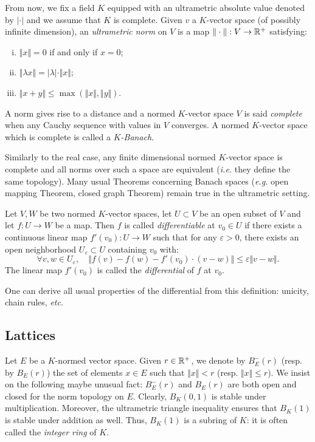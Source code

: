 \documentclass{amsart}
\begin{document}
From now, we fix a field $K$ equipped with an ultrametric absolute value 
denoted by $|\cdot|$ and we assume that $K$ is complete. Given $v$ a 
$K$-vector space (of possibly infinite dimension), an \emph{ultrametric 
norm} on $V$ is a map $\Vert\cdot\Vert : V \to \mathbb R^+$ satisfying:
\begin{enumerate}[(i)]
\item $\Vert x\Vert = 0$ if and only if $x = 0$;
\item $\Vert \lambda x\Vert = |\lambda| \cdot \Vert x\Vert$;
\item $\Vert x+y\Vert \leq \max(\Vert x\Vert, \Vert y\Vert)$.
\end{enumerate}
A norm gives rise to a distance and a normed $K$-vector space $V$ is 
said \emph{complete} when any Cauchy sequence with values in $V$ 
converges. A normed $K$-vector space which is complete is called a 
\emph{$K$-Banach}.

Similarly to the real case, any finite dimensional normed $K$-vector 
space is complete and all norms over such a space are equivalent 
(\emph{i.e.} they define the same topology). Many usual Theorems 
concerning Banach spaces (\emph{e.g.} open mapping Theorem, closed graph 
Theorem) remain true in the ultrametric setting.

\begin{deftn}
Let $V, W$ be two normed $K$-vector spaces, let $U \subset V$ be an open 
subset of $V$ and let $f : U \rightarrow W$ be a map. Then $f$ is called 
\emph{differentiable} at $v_0 \in U$ if there exists a 
continuous linear map $f'(v_0) : U \rightarrow W$ such that for any 
$\varepsilon >0$, there exists an open neighborhood $U_\varepsilon 
\subset U$ containing $v_0$ with:
\[ 
\forall v, w \in U_\varepsilon, \quad
\Vert f(v)-f(w)-f'(v_0) \cdot \left( v-w \right) \Vert 
\leq \varepsilon \Vert v-w \Vert. 
\]
The linear map $f'(v_0)$ is called the \emph{differential} of $f$ at $v_0$.
\end{deftn}

One can derive all usual properties of the differential from this 
definition: unicity, chain rules, \emph{etc}.

\subsection{Lattices}

Let $E$ be a $K$-normed vector space. Given $r \in \mathbb R^+$, 
we denote by $B^-_E(r)$ (resp. by $B_E(r)$) the set of elements $x 
\in E$ such that $\Vert x \Vert < r$ (resp. $\Vert x \Vert \leq r$). 
We insist on the following maybe unusual fact: $B^-_E(r)$ and 
$B_E(r)$ are both open and closed for the norm topology on $E$.
Clearly, $B_K(0,1)$ is stable under multiplication. Moreover, the 
ultrametric triangle inequality ensures that $B_K(1)$ is stable under 
addition as well. Thus, $B_K(1)$ is a subring of $K$: it is often 
called the \emph{integer ring} of $K$.
\end{document}
